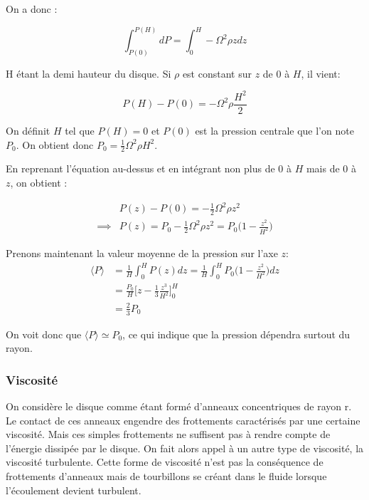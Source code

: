 \documentclass[a4paper,12pt]{article}
\begin{document}
On a donc :

\begin{equation*}
    \int_{P(0)}^{P(H)} dP=\int_0^H -\Omega ^2 \rho z dz
\end{equation*}

H étant la demi hauteur du disque. Si $\rho$ est constant sur $z$ de $0$ à $H$, il vient:

\begin{equation*}
    P(H)-P(0)= -\Omega ^2 \rho \frac{H^2}{2}
\end{equation*}

On définit $H$ tel que $P(H)=0$ et $P(0)$ est la pression centrale que l'on note $P_0$.
On obtient donc $P_0=\frac{1}{2}\Omega ^2\rho H^2$.

En reprenant l'équation au-dessus et en intégrant non plus de $0$ à $H$ mais de $0$ à $z$, on obtient :

\begin{equation*}
\begin{split}
    &P(z)-P(0) =-\frac{1}{2}\Omega ^2 \rho z^2\\
    \implies &P(z) =P_0-\frac{1}{2}\Omega ^2 \rho z^2=P_0\Big( 1-\frac{z^2}{H^2} \Big)
\end{split}
\end{equation*}

Prenons maintenant la valeur moyenne de la pression sur l'axe $z$:
\begin{equation*}
\begin{split}
    \langle P \rangle &= \frac{1}{H} \int_0^H P(z) dz = \frac{1}{H} \int_0^H P_0\Big( 1-\frac{z^2}{H^2}\Big) dz\\
    &=\frac{P_0}{H}\Big[ z-\frac{1}{3}\frac{z^3}{H^2} \Big]_0^H\\
    &=\frac{2}{3}P_0
\end{split}
\end{equation*}

On voit donc que $\langle P\rangle \simeq P_0$, ce qui indique que la pression dépendra surtout du rayon.

\subsubsection{Viscosité}

On considère le disque comme étant formé d'anneaux concentriques de rayon r. Le contact de ces anneaux engendre des frottements caractérisés par une certaine viscosité. Mais ces simples frottements ne suffisent pas à rendre compte de l'énergie dissipée par le disque. On fait alors appel à un autre type de viscosité, la viscosité turbulente. Cette forme de viscosité n'est pas la conséquence de frottements d'anneaux mais de tourbillons se créant dans le fluide lorsque l'écoulement devient turbulent. 
\end{document}
